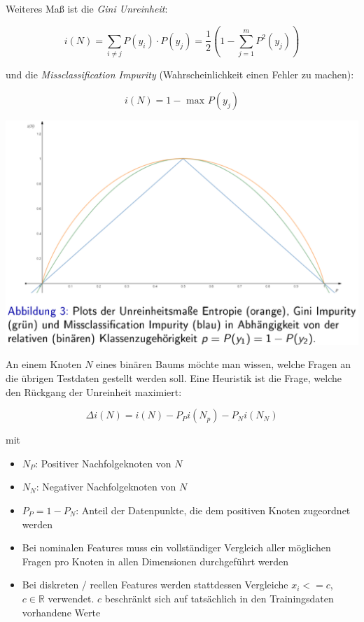 \documentclass{report}
\begin{document}
Weiteres Maß ist die \textit{Gini Unreinheit}:

$$i(N) = \sum_{i\neq j}P(y_i)\cdot P(y_j) = \frac{1}{2}(1 - \sum_{j=1}^mP^2(y_j))$$

und die \textit{Missclassification Impurity} (Wahrscheinlichkeit einen Fehler zu machen):

$$i(N) = 1 - \text{ max }P(y_j)$$

\begin{center}
  \includegraphics[scale=.3]{ml07_6}
\end{center}

An einem Knoten $N$ eines binären Baums möchte man wissen, welche Fragen an die übrigen Testdaten gestellt werden soll.
Eine Heuristik ist die Frage, welche den Rückgang der Unreinheit maximiert:

$$\Delta i(N) = i(N) - P_Pi(N_p) - P_Ni(N_N)$$

mit\\
\vspace*{-1.5em}
\begin{itemize}
  \item $N_P$: Positiver Nachfolgeknoten von $N$
  \item $N_N$: Negativer Nachfolgeknoten von $N$
  \item $P_P = 1 - P_N$: Anteil der Datenpunkte, die dem positiven Knoten zugeordnet werden
  \item Bei nominalen Features muss ein vollständiger Vergleich aller möglichen Fragen pro Knoten in allen
  Dimensionen durchgeführt werden
  \item Bei diskreten / reellen Features werden stattdessen Vergleiche $x_i <= c$, $c\in \mathbb{R}$ verwendet.
  $c$ beschränkt sich auf tatsächlich in den Trainingsdaten vorhandene Werte
\end{itemize}
\end{document}
